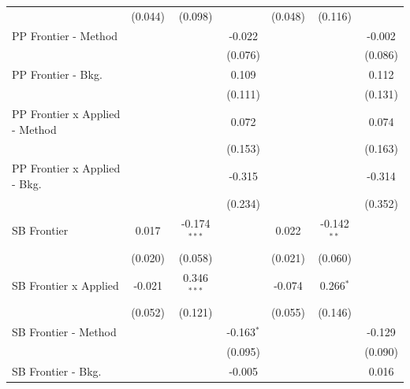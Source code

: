 \begin{tabular}{lcccccc}
                                  & (0.044)        & (0.098)        &              & (0.048)        & (0.116)       &   \\   
   PP Frontier - Method           &                &                & -0.022       &                &               & -0.002\\   
                                  &                &                & (0.076)      &                &               & (0.086)\\   
   PP Frontier - Bkg.             &                &                & 0.109        &                &               & 0.112\\   
                                  &                &                & (0.111)      &                &               & (0.131)\\   
   PP Frontier x Applied - Method &                &                & 0.072        &                &               & 0.074\\   
                                  &                &                & (0.153)      &                &               & (0.163)\\   
   PP Frontier x Applied - Bkg.   &                &                & -0.315       &                &               & -0.314\\   
                                  &                &                & (0.234)      &                &               & (0.352)\\   
   SB Frontier                    & 0.017          & -0.174$^{***}$ &              & 0.022          & -0.142$^{**}$ &   \\   
                                  & (0.020)        & (0.058)        &              & (0.021)        & (0.060)       &   \\   
   SB Frontier x Applied          & -0.021         & 0.346$^{***}$  &              & -0.074         & 0.266$^{*}$   &   \\   
                                  & (0.052)        & (0.121)        &              & (0.055)        & (0.146)       &   \\   
   SB Frontier - Method           &                &                & -0.163$^{*}$ &                &               & -0.129\\   
                                  &                &                & (0.095)      &                &               & (0.090)\\   
   SB Frontier - Bkg.             &                &                & -0.005       &                &               & 0.016\\   

\end{tabular}

